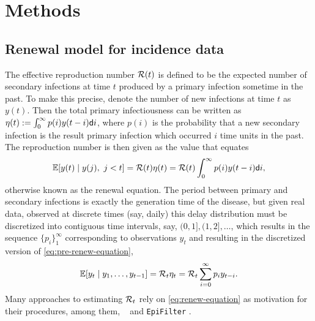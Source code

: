 \section{Methods}

\subsection{Renewal model for incidence data} 

The effective reproduction number $\mathcal{R}(t)$
is defined to be the expected number of secondary infections at time $t$
produced by a primary infection sometime in the past.
To make this precise, denote the number
of new infections at time $t$ as $y(t)$. Then the total primary
infectiousness can be written as $\eta(t) := \int_0^{\infty} p(i) y(t-i)
\mathsf{d} i$,
where $p(i)$ is the probability that a new secondary infection is the result
primary infection which occurred $i$ time units in the past. 
The reproduction number is
then given as the value that equates
\begin{equation} \label{eq:pre-renew-equation}
  \mathbb{E}[y(t) \mid y(j),\ j<t] = \mathcal{R}(t)\eta(t) = \mathcal{R}(t)\int_0^\infty p(i)y(t-i)\mathsf{d} i,
\end{equation}
otherwise known as the renewal equation. 
The period between primary and secondary
infections is exactly the generation time of the disease, but given real data,
observed at discrete times (say, daily) this delay distribution must be discretized
into contiguous time intervals,
say, $(0,1], (1,2], \dots$, which results in the sequence $\{p_i\}_1^\infty$
corresponding to observations $y_t$ and resulting in the
discretized version of \eqref{eq:pre-renew-equation},
\begin{equation} \label{eq:renew-equation}
  \mathbb{E}[y_t \mid y_1,\ldots,y_{t-1}] = \mathcal{R}_t\eta_t = \mathcal{R}_t\sum_{i = 0}^\infty p_i y_{t-i}.
\end{equation}
Many approaches to estimating $\mathcal{R}_t$ rely on \eqref{eq:renew-equation} as
motivation for their procedures, among them,
\EpiEstim\ \citep{cori2013new} and \texttt{EpiFilter}
\citep{parag2021improved}. 


